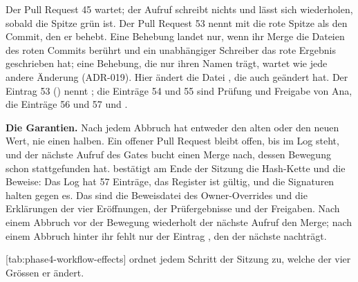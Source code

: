 Der Pull Request 45 wartet; der Aufruf schreibt nichts
und lässt sich wiederholen, sobald die Spitze grün ist.
Der Pull Request 53 nennt mit  die rote Spitze als den Commit, den er behebt.
Eine Behebung landet nur, wenn ihr Merge die Dateien des roten Commits berührt
und ein unabhängiger Schreiber das rote Ergebnis geschrieben hat;
eine Behebung, die nur ihren Namen trägt, wartet wie jede andere Änderung (ADR-019).
Hier ändert  die Datei , die auch  geändert hat.
Der Eintrag 53 () nennt ; die Einträge 54 und 55 sind Prüfung
und Freigabe von Ana, die Einträge 56 und 57  und .

{\bf Die Garantien.}
Nach jedem Abbruch hat  entweder den alten oder den neuen Wert, nie einen halben.
Ein offener Pull Request bleibt offen, bis  im Log steht, und der nächste Aufruf
des Gates bucht einen Merge nach, dessen Bewegung schon stattgefunden hat.
 bestätigt am Ende der Sitzung die Hash-Kette und die Beweise: Das Log hat
57 Einträge, das Register ist gültig, und die Signaturen halten gegen es.
Das sind die Beweisdatei des Owner-Overrides und die Erklärungen der vier Eröffnungen, der
Prüfergebnisse und der Freigaben.
Nach einem Abbruch vor der Bewegung wiederholt der nächste Aufruf den Merge;
nach einem Abbruch hinter ihr fehlt nur der Eintrag ,
den der nächste  nachträgt.

[tab:phase4-workflow-effects] ordnet jedem Schritt der Sitzung zu, welche der vier
Grössen er ändert.

